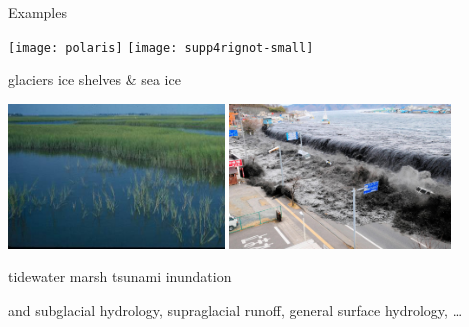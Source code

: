 \documentclass{beamer}
\begin{document}
\begin{frame}{Examples}

\texttt{[image: polaris]}
\hfill
\texttt{[image: supp4rignot-small]}

\small glaciers \hfill ice shelves \& sea ice

\medskip
\includegraphics[width=0.43\textwidth,keepaspectratio=true]{marsh-water}
\hfill
\includegraphics[width=0.44\textwidth,keepaspectratio=true]{tsunami-sendai}

\small tidewater marsh \hfill tsunami inundation


\medskip
\scriptsize and subglacial hydrology, supraglacial runoff, general surface hydrology, \dots


\end{frame}
\end{document}

